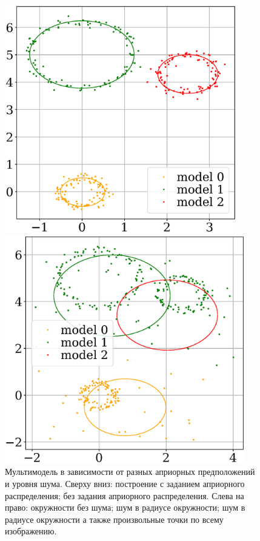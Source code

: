 \documentclass[12pt, twoside]{article}
\numberwithin{equation}{section}
\begin{document}
\begin{figure}[h!]
\begin{minipage}{.32\textwidth}
\end{minipage}
\begin{minipage}{.32\textwidth}
\hspace{2mm}
      \includegraphics[width =  0.9\textwidth]{figures/911.eps}
\end{minipage}
\begin{minipage}{.32\textwidth}
\hspace{-2.3mm}
      \includegraphics[width =  0.935\textwidth]{figures/912.eps}
\end{minipage}
\caption{Мультимодель в зависимости от разных априорных предположений и уровня шума. Сверху вниз: построение с заданием априорного распределения; без задания априорного распределения. Слева на право: окружности без шума; шум в радиусе окружности; шум в радиусе окружности а также произвольные точки по всему изображению.}
\label{ce:fig3}
\end{figure}
\end{document}
